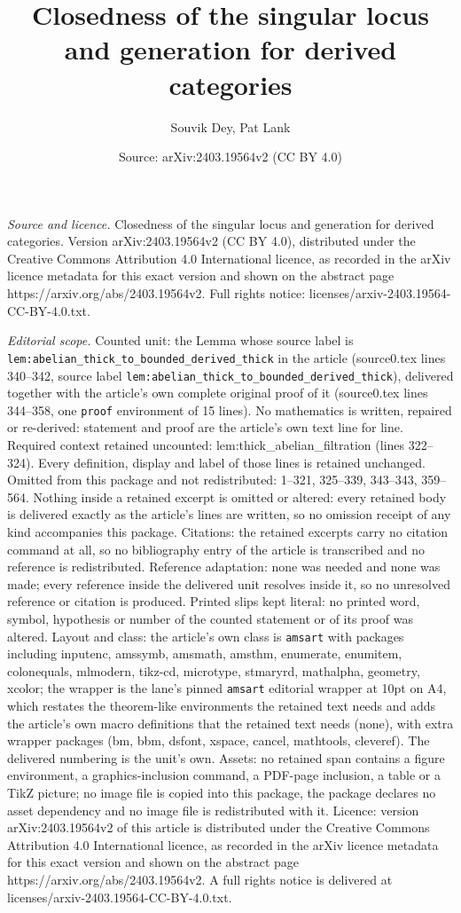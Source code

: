 \documentclass[10pt,a4paper]{amsart}
\title[Closedness of the singular locus and generation for derived ]{Closedness of the singular locus and generation for derived categories}
\author{Souvik Dey, Pat Lank}
\date{Source: arXiv:2403.19564v2 (CC BY 4.0)}
\begin{document}
\maketitle

\noindent\emph{Source and licence.} Closedness of the singular locus and generation for derived categories. Version arXiv:2403.19564v2 (CC BY 4.0), distributed under the Creative Commons Attribution 4.0 International licence, as recorded in the arXiv licence metadata for this exact version and shown on the abstract page https://arxiv.org/abs/2403.19564v2. Full rights notice: licenses/arxiv-2403.19564-CC-BY-4.0.txt.\par\smallskip

\noindent\textit{Editorial scope.} Counted unit: the Lemma whose source label is \texttt{lem:abelian\_thick\_to\_bounded\_derived\_thick} in the article (source0.tex lines 340--342, source label \texttt{lem:abelian\_thick\_to\_bounded\_derived\_thick}), delivered together with the article's own complete original proof of it (source0.tex lines 344--358, one \texttt{proof} environment of 15 lines). No mathematics is written, repaired or re-derived: statement and proof are the article's own text line for line. Required context retained uncounted: lem:thick\_abelian\_filtration (lines 322--324). Every definition, display and label of those lines is retained unchanged. Omitted from this package and not redistributed: 1--321, 325--339, 343--343, 359--564. Nothing inside a retained excerpt is omitted or altered: every retained body is delivered exactly as the article's lines are written, so no omission receipt of any kind accompanies this package. Citations: the retained excerpts carry no citation command at all, so no bibliography entry of the article is transcribed and no reference is redistributed. Reference adaptation: none was needed and none was made; every reference inside the delivered unit resolves inside it, so no unresolved reference or citation is produced. Printed slips kept literal: no printed word, symbol, hypothesis or number of the counted statement or of its proof was altered. Layout and class: the article's own class is \texttt{amsart} with packages including inputenc, amssymb, amsmath, amsthm, enumerate, enumitem, colonequals, mlmodern, tikz-cd, microtype, stmaryrd, mathalpha, geometry, xcolor; the wrapper is the lane's pinned \texttt{amsart} editorial wrapper at 10pt on A4, which restates the theorem-like environments the retained text needs and adds the article's own macro definitions that the retained text needs (none), with extra wrapper packages (bm, bbm, dsfont, xspace, cancel, mathtools, cleveref). The delivered numbering is the unit's own. Assets: no retained span contains a figure environment, a graphics-inclusion command, a PDF-page inclusion, a table or a TikZ picture; no image file is copied into this package, the package declares no asset dependency and no image file is redistributed with it. Licence: version arXiv:2403.19564v2 of this article is distributed under the Creative Commons Attribution 4.0 International licence, as recorded in the arXiv licence metadata for this exact version and shown on the abstract page https://arxiv.org/abs/2403.19564v2. A full rights notice is delivered at licenses/arxiv-2403.19564-CC-BY-4.0.txt. 
\end{document}
